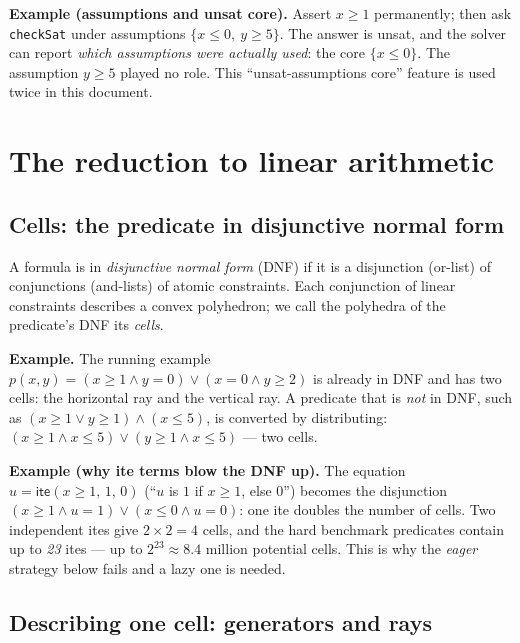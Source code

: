 \documentclass[11pt]{article}
\begin{document}
\begin{exbox}
\textbf{Example (assumptions and unsat core).} Assert $x \ge 1$
permanently; then ask \texttt{checkSat} under assumptions
$\{x \le 0,\ y \ge 5\}$. The answer is \textsf{unsat}, and the solver can
report \emph{which assumptions were actually used}: the core
$\{x \le 0\}$. The assumption $y \ge 5$ played no role. This
``unsat-assumptions core'' feature is used twice in this document.
\end{exbox}

\section{The reduction to linear arithmetic}

\subsection{Cells: the predicate in disjunctive normal form}

A formula is in \emph{disjunctive normal form} (DNF) if it is a disjunction
(or-list) of conjunctions (and-lists) of atomic constraints. Each
conjunction of linear constraints describes a convex polyhedron; we call
the polyhedra of the predicate's DNF its \emph{cells}.

\begin{exbox}
\textbf{Example.} The running example
$p(x,y) = (x \ge 1 \wedge y = 0) \vee (x = 0 \wedge y \ge 2)$
is already in DNF and has two cells: the horizontal ray and the vertical
ray. A predicate that is \emph{not} in DNF, such as
$(x \ge 1 \vee y \ge 1) \wedge (x \le 5)$, is converted by distributing:
$(x \ge 1 \wedge x \le 5) \vee (y \ge 1 \wedge x \le 5)$ --- two cells.
\end{exbox}

\begin{exbox}
\textbf{Example (why \textsf{ite} terms blow the DNF up).} The equation
$u = \mathsf{ite}(x \ge 1,\, 1,\, 0)$ (``$u$ is $1$ if $x \ge 1$, else
$0$'') becomes the disjunction
$(x \ge 1 \wedge u = 1) \vee (x \le 0 \wedge u = 0)$: one \textsf{ite}
doubles the number of cells. Two independent \textsf{ite}s give
$2 \times 2 = 4$ cells, and the hard benchmark predicates contain up to
\emph{23} \textsf{ite}s --- up to $2^{23} \approx 8.4$ million potential
cells. This is why the \emph{eager} strategy below fails and a lazy one is
needed.
\end{exbox}

\subsection{Describing one cell: generators and rays}
\end{document}
